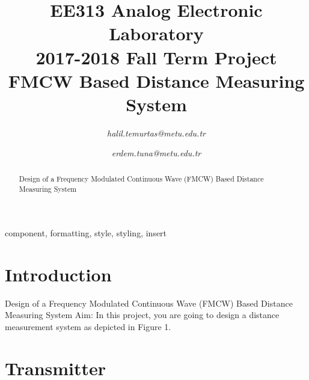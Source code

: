 \documentclass[paper]{IEEEtran}
\begin{document}
\title{EE313 Analog Electronic Laboratory\\
2017-2018 Fall Term Project \\
FMCW Based Distance Measuring System
}


\author{

\textit{halil.temurtas@metu.edu.tr}

\and

\textit{erdem.tuna@metu.edu.tr}

}

\maketitle

\begin{abstract}

Design of a Frequency Modulated Continuous Wave (FMCW) Based Distance Measuring System

\end{abstract}

\begin{IEEEkeywords}
component, formatting, style, styling, insert
\end{IEEEkeywords}

\section{Introduction}

Design of a Frequency Modulated Continuous Wave (FMCW) Based Distance Measuring System
Aim: In this project, you are going to design a distance measurement system as depicted in Figure 1.

\section{Transmitter}
\end{document}
